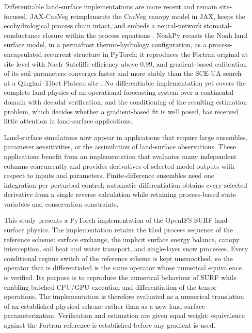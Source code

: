 Differentiable land-surface implementations are more recent and remain
site-focused. JAX-CanVeg reimplements the CanVeg canopy model in JAX, keeps
the ecohydrological process chain intact, and embeds a neural-network
stomatal-conductance closure within the process equations
\citep{Jiang2025JAXCanVeg}. NoahPy recasts the Noah land surface model, in a
permafrost thermo-hydrology configuration, as a process-encapsulated
recurrent structure in PyTorch; it reproduces the Fortran original at site
level with Nash--Sutcliffe efficiency above 0.99, and gradient-based
calibration of its soil parameters converges faster and more stably than the
SCE-UA search at a Qinghai--Tibet Plateau site \citep{NoahPy2026}. No
differentiable implementation yet covers the complete land physics of an
operational forecasting system over a continental domain with decadal
verification, and the conditioning of the resulting estimation problem,
which decides whether a gradient-based fit is well posed, has received
little attention in land-surface applications.

Land-surface simulations now appear in applications that require large
ensembles, parameter sensitivities, or the assimilation of land-surface
observations. These applications benefit from an implementation that
evaluates many independent columns concurrently and provides derivatives of
selected model outputs with respect to inputs and parameters.
Finite-difference ensembles need one integration per perturbed control;
automatic differentiation obtains every selected derivative from a single
reverse calculation while retaining process-based state variables and
conservation constraints.

This study presents a PyTorch implementation of the OpenIFS SURF land-surface
physics. The implementation retains the tiled process sequence of the reference scheme:
surface exchange, the implicit surface energy balance, canopy interception,
soil heat and water transport, and single-layer snow processes. Every
conditional regime switch of the reference scheme is kept unsmoothed, so the
operator that is differentiated is the same operator whose numerical
equivalence is verified. Its purpose is
to reproduce the numerical behaviour of SURF while enabling batched CPU/GPU
execution and differentiation of the tensor operations. The implementation is
therefore evaluated as a numerical translation of an established physical
scheme rather than as a new land-surface parameterization. Verification and
estimation are given equal weight: equivalence against the Fortran reference
is established before any gradient is used.


